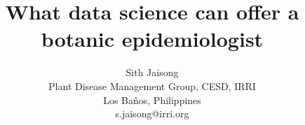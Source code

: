 \documentclass[12pt,a4paper]{article}
\begin{document}
\thispagestyle{empty}

\title{\textbf{What data science can offer a botanic epidemiologist}}
\author{Sith Jaisong \\
Plant Disease Management Group, CESD, IRRI\\ Los Ba\~{n}os, Philippines\\
s.jaisong@irri.org}
\date{} %
\maketitle\thispagestyle{empty} %

\end{document}

